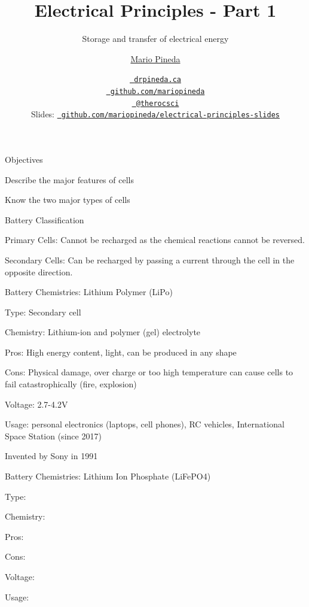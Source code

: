 \documentclass[12pt,t]{beamer}
\title{Electrical Principles - Part 1}
\subtitle{Storage and transfer of electrical energy}
\author{\href{www.drpineda.ca}{Mario Pineda}}
\institute{Queen Elizabeth High School}
\date{\href{www.drpineda.ca}{\tt \scriptsize \color{foreground} drpineda.ca}
\\[-4pt]
\href{https://github.com/mariopineda}{\tt \scriptsize \color{foreground} github.com/mariopineda}
\\[-4pt]
\href{https://twitter.com/therocsci}{\tt \scriptsize \color{foreground} @therocsci}
\\[2pt]
\scriptsize {\lolit Slides:} \href{https://github.com/mariopineda/electrical-principles-slides}{\tt \scriptsize
  \color{foreground} github.com/mariopineda/electrical-principles-slides}
}
\begin{document}
{

\begin{frame}[c]{Objectives}
\bbi
\item Describe the major features of cells
\item Know the two major types of cells
\ei
\end{frame}

\begin{frame}[c]{Battery Classification}
\bbi
\item Primary Cells: Cannot be recharged as the chemical reactions cannot be reversed.
\item Secondary Cells: Can be recharged by passing a current through the cell in the opposite direction.
\ei
\end{frame}

\begin{frame}[c]{Battery Chemistries: Lithium Polymer (LiPo)}
\bbi
\item Type: Secondary cell
\item Chemistry: Lithium-ion and polymer (gel) electrolyte
\item Pros: High energy content, light, can be produced in any shape
\item Cons: Physical damage, over charge or too high temperature can cause cells to fail catastrophically (fire, explosion)
\item Voltage: 2.7-4.2V
\item Usage: personal electronics (laptops, cell phones), RC vehicles, International Space Station (since 2017)
\item Invented by Sony in 1991
\ei
\end{frame}

\begin{frame}[c]{Battery Chemistries: Lithium Ion Phosphate (LiFePO4)}
\bbi
\item Type:
\item Chemistry:
\item Pros:
\item Cons:
\item Voltage:
\item Usage:
\ei
\end{frame}

}
\end{document}
